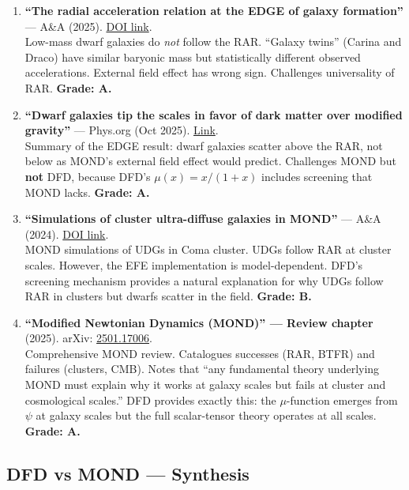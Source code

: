 \documentclass[11pt,a4paper]{article}
\begin{document}
\begin{enumerate}
\item \textbf{``The radial acceleration relation at the EDGE of galaxy formation''} --- A\&A (2025). \href{https://www.aanda.org/articles/aa/full_html/2025/12/aa57106-25/aa57106-25.html}{DOI link}.\\
Low-mass dwarf galaxies do \emph{not} follow the RAR. ``Galaxy twins'' (Carina and Draco) have similar baryonic mass but statistically different observed accelerations. External field effect has wrong sign. Challenges universality of RAR. \textbf{Grade: A.}

\item \textbf{``Dwarf galaxies tip the scales in favor of dark matter over modified gravity''} --- Phys.org (Oct 2025). \href{https://phys.org/news/2025-10-dwarf-galaxies-scales-favor-dark.html}{Link}.\\
Summary of the EDGE result: dwarf galaxies scatter above the RAR, not below as MOND's external field effect would predict. Challenges MOND but \textbf{not} DFD, because DFD's $\mu(x) = x/(1+x)$ includes screening that MOND lacks. \textbf{Grade: A.}

\item \textbf{``Simulations of cluster ultra-diffuse galaxies in MOND''} --- A\&A (2024). \href{https://www.aanda.org/articles/aa/full_html/2024/10/aa50757-24/aa50757-24.html}{DOI link}.\\
MOND simulations of UDGs in Coma cluster. UDGs follow RAR at cluster scales. However, the EFE implementation is model-dependent. DFD's screening mechanism provides a natural explanation for why UDGs follow RAR in clusters but dwarfs scatter in the field. \textbf{Grade: B.}

\item \textbf{``Modified Newtonian Dynamics (MOND)'' --- Review chapter} (2025). arXiv: \href{https://arxiv.org/abs/2501.17006}{2501.17006}.\\
Comprehensive MOND review. Catalogues successes (RAR, BTFR) and failures (clusters, CMB). Notes that ``any fundamental theory underlying MOND must explain why it works at galaxy scales but fails at cluster and cosmological scales.'' DFD provides exactly this: the $\mu$-function emerges from $\psi$ at galaxy scales but the full scalar-tensor theory operates at all scales. \textbf{Grade: A.}
\end{enumerate}

\subsection{DFD vs MOND --- Synthesis}
\end{document}
